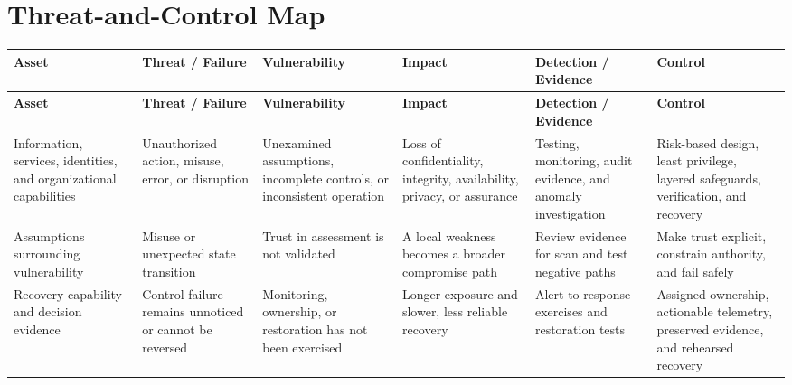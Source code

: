 \documentclass[11pt,letterpaper]{article}
\begin{document}
\section*{Threat-and-Control Map}
\begingroup\scriptsize\setlength{\tabcolsep}{2pt}
\begin{longtable}{>{\raggedright\arraybackslash}p{}>{\raggedright\arraybackslash}p{}>{\raggedright\arraybackslash}p{}>{\raggedright\arraybackslash}p{}>{\raggedright\arraybackslash}p{}>{\raggedright\arraybackslash}p{}}
\toprule\rowcolor{Navy}\color{white}\textbf{Asset} & \color{white}\textbf{Threat / Failure} & \color{white}\textbf{Vulnerability} & \color{white}\textbf{Impact} & \color{white}\textbf{Detection / Evidence} & \color{white}\textbf{Control}\\\midrule
\endfirsthead
\toprule\rowcolor{Navy}\color{white}\textbf{Asset} & \color{white}\textbf{Threat / Failure} & \color{white}\textbf{Vulnerability} & \color{white}\textbf{Impact} & \color{white}\textbf{Detection / Evidence} & \color{white}\textbf{Control}\\\midrule
\endhead
Information, services, identities, and organizational capabilities & Unauthorized action, misuse, error, or disruption & Unexamined assumptions, incomplete controls, or inconsistent operation & Loss of confidentiality, integrity, availability, privacy, or assurance & Testing, monitoring, audit evidence, and anomaly investigation & Risk-based design, least privilege, layered safeguards, verification, and recovery\\\midrule
Assumptions surrounding vulnerability & Misuse or unexpected state transition & Trust in assessment is not validated & A local weakness becomes a broader compromise path & Review evidence for scan and test negative paths & Make trust explicit, constrain authority, and fail safely\\\midrule
Recovery capability and decision evidence & Control failure remains unnoticed or cannot be reversed & Monitoring, ownership, or restoration has not been exercised & Longer exposure and slower, less reliable recovery & Alert-to-response exercises and restoration tests & Assigned ownership, actionable telemetry, preserved evidence, and rehearsed recovery\\\midrule
\bottomrule
\end{longtable}
\endgroup
\end{document}
